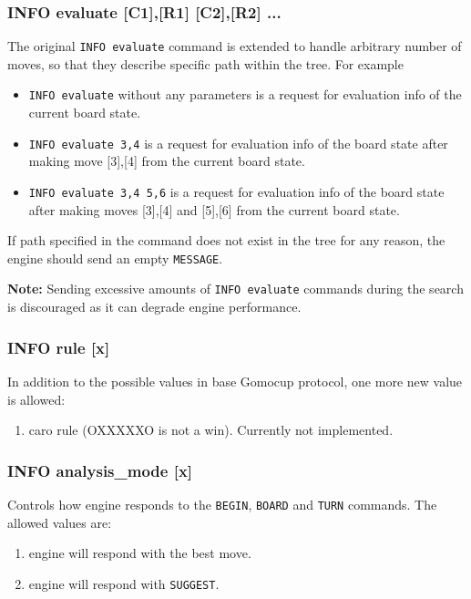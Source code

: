 \documentclass[12pt,a4paper]{article}
\begin{document}
\subsubsection{INFO evaluate [C1],[R1] [C2],[R2] ...}
The original \texttt{INFO evaluate} command is extended to handle arbitrary number of moves, so that they describe specific path within the tree. For example 
\begin{itemize}
\item{\texttt{INFO evaluate} without any parameters is a request for evaluation info of the current board state.}
\item{\texttt{INFO evaluate 3,4} is a request for evaluation info of the board state after making move [3],[4] from the current board state.}
\item{\texttt{INFO evaluate 3,4 5,6} is a request for evaluation info of the board state after making moves [3],[4] and [5],[6] from the current board state.}
\end{itemize}
If path specified in the command does not exist in the tree for any reason, the engine should send an empty \texttt{MESSAGE}.

\textbf{Note:} Sending excessive amounts of \texttt{INFO evaluate} commands during the search is discouraged as it can degrade engine performance.

\subsubsection{INFO rule [x]}
\label{cmd_info_rule}
In addition to the possible values in base Gomocup protocol, one more new value is allowed:
\begin{enumerate}[leftmargin=7.5em]
	\item[\text{$[x]=8$}]{caro rule (OXXXXXO is not a win). Currently not implemented.}
	\end{enumerate}

\subsubsection{INFO analysis{\_}mode [x]}
Controls how engine responds to the \texttt{BEGIN}, \texttt{BOARD} and \texttt{TURN} commands. The allowed values are:
\begin{enumerate}[leftmargin=7.5em]
	\item[\text{$[x]=0$}]{engine will respond with the best move.}
	\item[\text{$[x]=1$}]{engine will respond with \texttt{SUGGEST}.}
\end{enumerate}
\end{document}

